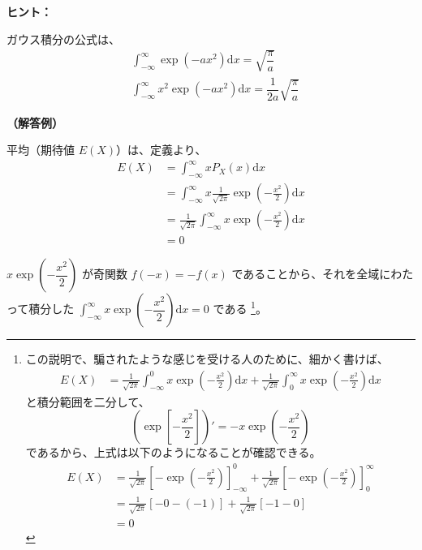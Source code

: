 \documentclass[uplatex,dvipdfmx,a4paper,11pt]{jsarticle}
\newcommand{\diff}{\mathrm d}
\begin{document}
\begin{enumerate}
\begin{itembox}[l]{{\bf ヒント：}}

ガウス積分の公式は、
\begin{align*}
&\int_{-\infty}^{\infty} \exp(-ax^2) \diff x = \sqrt{\dfrac{\pi}{a}} \\
&\int_{-\infty}^{\infty} x^2 \exp(-ax^2) \diff x = \dfrac{1}{2a} \sqrt{\dfrac{\pi}{a}}
\end{align*}

\end{itembox}

{\bf （解答例）}

平均（期待値 $E(X)$）は、定義より、
\begin{align*}
E(X) &= \int_{-\infty}^{\infty} x P_X(x) \diff x \\
	&= \int_{-\infty}^{\infty} x \frac{1}{\sqrt{2 \pi}} \exp \left(- \frac{x^2}{2} \right) \diff x \\
	&= \frac{1}{\sqrt{2 \pi}} \int_{-\infty}^{\infty} x \exp \left(- \frac{x^2}{2} \right) \diff x \\
	&= 0
\end{align*}

$x \exp \left(- \dfrac{x^2}{2} \right)$ が奇関数 $f(-x) = -f(x)$ であることから、それを全域にわたって積分した
$\displaystyle \int_{-\infty}^{\infty} x \exp \left(- \dfrac{x^2}{2} \right) \diff x =0$ である
\footnote{
この説明で、騙されたような感じを受ける人のために、細かく書けば、
\begin{align*}
E(X) 
	&= \frac{1}{\sqrt{2 \pi}} \int_{-\infty}^{0} x \exp \left(- \frac{x^2}{2} \right) \diff x 
	+ \frac{1}{\sqrt{2 \pi}} \int_{0}^{\infty} x \exp \left(- \frac{x^2}{2} \right) \diff x
\end{align*}
と積分範囲を二分して、
\begin{equation*}
\left(\exp \left[- \frac{x^2}{2} \right] \right)' = -x \exp \left(- \frac{x^2}{2} \right)
\end{equation*}
であるから、上式は以下のようになることが確認できる。
\begin{align*}
E(X)
	&= \frac{1}{\sqrt{2 \pi}} \left[ - \exp \left(- \frac{x^2}{2} \right)\right]_{-\infty}^{0}
	+\frac{1}{\sqrt{2 \pi}} \left[ - \exp \left(- \frac{x^2}{2} \right)\right]_{0}^{\infty} \\
	&= \frac{1}{\sqrt{2 \pi}} [ -0 -(-1) ] + \frac{1}{\sqrt{2 \pi}} [-1 -0] \\
	&=0
\end{align*}
}。

\vspace{10pt}


\end{enumerate}
\end{document}
